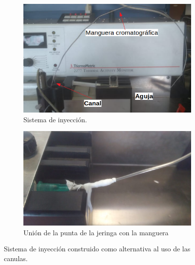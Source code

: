 	\begin{figure}[h]
		\centering
		\begin{subfigure}[b]{0.55\textwidth}
			\includegraphics[width=\linewidth]{Figures/sistemaInyeccion}
			\caption{Sistema de inyección.}
			\label{fig: sistemaInyeccion}
		\end{subfigure}
		\begin{subfigure}[b]{0.4\textwidth}
			\includegraphics[width=\linewidth]{Figures/acopleManguera}
			\caption{Unión de la punta de la jeringa con la manguera}
			\label{fig: acopleManguera}
		\end{subfigure}
		\caption{Sistema de inyección construido como alternativa al uso de las canulas.}
	\end{figure}
	
